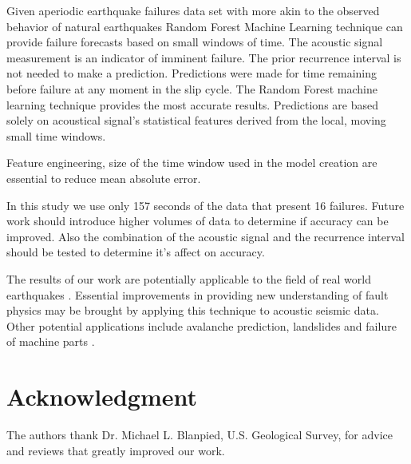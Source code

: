 \documentclass[]{llncs} %
\begin{document}
Given aperiodic earthquake failures data set with more akin to the observed behavior of natural earthquakes Random Forest Machine Learning technique can provide failure forecasts based on small windows of time. The acoustic signal measurement is an indicator of imminent failure. The prior recurrence interval is not needed to make a prediction. Predictions were made for time remaining before failure at any moment in the slip cycle.  The Random Forest machine learning technique provides the most accurate results. Predictions are based solely on acoustical signal's statistical features derived from the local, moving small time windows.\par
Feature engineering, size of the time window used in the model creation are essential to reduce mean absolute error. \par
%
In this study we use only 157 seconds of the data that present 16 failures. Future work should introduce higher volumes of data to determine if accuracy can be improved. Also the combination of the acoustic signal and the recurrence interval should be tested to determine it's affect on accuracy.
\par
The results of our work are potentially applicable to the field of real world earthquakes \cite{Bertrand}. Essential improvements in providing new understanding of fault physics may be brought by applying this technique to acoustic seismic data. Other potential applications include avalanche prediction, landslides and failure of machine parts \cite{Bertrand}. \par

\section{Acknowledgment}
The authors thank Dr. Michael L. Blanpied, U.S. Geological Survey, for advice and reviews that greatly improved our work.



\end{document}
